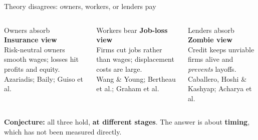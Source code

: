 \documentclass[aspectratio=169,11pt]{beamer}
\newcommand{\hl}[1]{{\color{WarmAmber}\bfseries #1}}
\newcommand{\muted}[1]{{\color{CoolGray}#1}}
\begin{document}
\begin{frame}{Theory disagrees: owners, workers, or lenders pay}
  \begin{columns}[T,onlytextwidth]
    \begin{cardbox}[fontupper=\footnotesize\raggedright]{Owners absorb}
      \textbf{Insurance view}\\[2pt]
      Risk-neutral owners smooth wages; losses hit profits and equity.\\[3pt]
      \muted{Azariadis; Baily; Guiso et al.}
    \end{cardbox}

    \begin{cardbox}[fontupper=\footnotesize\raggedright]{Workers bear}
      \textbf{Job-loss view}\\[2pt]
      Firms cut jobs rather than wages; displacement costs are large.\\[3pt]
      \muted{Wang \& Young; Bertheau et al.; Graham et al.}
    \end{cardbox}

    \begin{cardbox}[fontupper=\footnotesize\raggedright]{Lenders absorb}
      \textbf{Zombie view}\\[2pt]
      Credit keeps unviable firms alive and \emph{prevents} layoffs.\\[3pt]
      \muted{Caballero, Hoshi \& Kashyap; Acharya et al.}
    \end{cardbox}
  \end{columns}

  \vspace{6pt}
  \begin{keybox}
    \textbf{Conjecture:} all three hold, \hl{at different stages}.
    The answer is about \textbf{timing}, which has not been measured directly.
  \end{keybox}
\end{frame}
\end{document}
